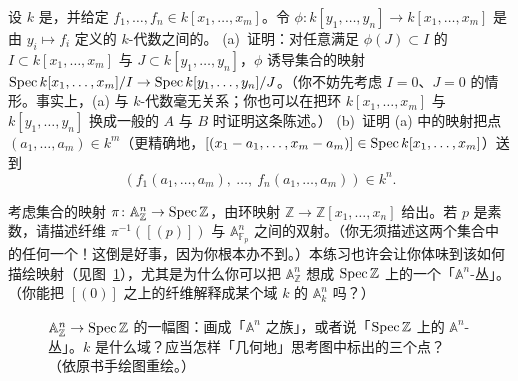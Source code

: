 \begin{exercise}\label{ex:polynomial-map-of-spectra}
设 $k$ 是\trField，并给定 $f_1,\dots,f_n\in k[x_1,\dots,x_m]$。令 $\phi\colon k[y_1,\dots,y_n]\to k[x_1,\dots,x_m]$ 是由 $y_i\mapsto f_i$ 定义的 $k$-代数之间的\trMorphism。
(a)~证明：对任意满足 $\phi(J)\subset I$ 的\trIdeal{} $I\subset k[x_1,\dots,x_m]$ 与 $J\subset k[y_1,\dots,y_n]$，$\phi$ 诱导集合的映射 $\operatorname{Spec} k[x_1,\dots,x_m]/I\to\operatorname{Spec} k[y_1,\dots,y_n]/J$。（你不妨先考虑 $I=0$、$J=0$ 的情形。事实上，(a) 与 $k$-代数毫无关系；你也可以在把环 $k[x_1,\dots,x_m]$ 与 $k[y_1,\dots,y_n]$ 换成一般的\trRing{} $A$ 与 $B$ 时证明这条陈述。）
(b)~证明 (a) 中的映射把点 $(a_1,\dots,a_m)\in k^m$（更精确地，$[(x_1-a_1,\dots,x_m-a_m)]\in\operatorname{Spec} k[x_1,\dots,x_m]$）送到
\[
(f_1(a_1,\dots,a_m),\ \dots,\ f_n(a_1,\dots,a_m))\in k^n.
\]
\end{exercise}

\begin{exercise}\label{ex:affine-space-over-z-picture}
考虑集合的映射 $\pi\colon\mathbb{A}^n_{\mathbb{Z}}\to\operatorname{Spec}\mathbb{Z}$，由环映射 $\mathbb{Z}\to\mathbb{Z}[x_1,\dots,x_n]$ 给出。若 $p$ 是素数，请描述纤维 $\pi^{-1}([(p)])$ 与 $\mathbb{A}^n_{\mathbb{F}_p}$ 之间的双射。（你无须描述这两个集合中的任何一个！这倒是好事，因为你根本办不到。）本练习也许会让你体味到该如何描绘映射（见图~\ref{fig:an-over-z-family}），尤其是为什么你可以把 $\mathbb{A}^n_{\mathbb{Z}}$ 想成 $\operatorname{Spec}\mathbb{Z}$ 上的一个「$\mathbb{A}^n$-丛」。（你能把 $[(0)]$ 之上的纤维解释成某个域 $k$ 的 $\mathbb{A}^n_k$ 吗？）
\end{exercise}

\begin{figure}[htbp]
\centering
{}
\caption{$\mathbb{A}^n_{\mathbb{Z}}\to\operatorname{Spec}\mathbb{Z}$ 的一幅图：画成「$\mathbb{A}^n$ 之族」，或者说「$\operatorname{Spec}\mathbb{Z}$ 上的 $\mathbb{A}^n$-丛」。$k$ 是什么域？应当怎样「几何地」思考图中标出的三个点？（依原书手绘图重绘。）}\label{fig:an-over-z-family}
\end{figure}

